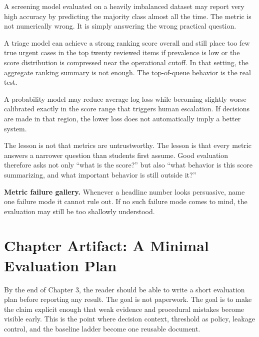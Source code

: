 \begin{example}
A screening model evaluated on a heavily imbalanced dataset may report very high accuracy by predicting the majority class almost all the time. The metric is not numerically wrong. It is simply answering the wrong practical question.
\end{example}

\begin{example}
A triage model can achieve a strong ranking score overall and still place too few true urgent cases in the top twenty reviewed items if prevalence is low or the score distribution is compressed near the operational cutoff. In that setting, the aggregate ranking summary is not enough. The top-of-queue behavior is the real test.
\end{example}

\begin{example}
A probability model may reduce average log loss while becoming slightly worse calibrated exactly in the score range that triggers human escalation. If decisions are made in that region, the lower loss does not automatically imply a better system.
\end{example}

The lesson is not that metrics are untrustworthy. The lesson is that every metric answers a narrower question than students first assume. Good evaluation therefore asks not only ``what is the score?'' but also ``what behavior is this score summarizing, and what important behavior is still outside it?''

\begin{thinkingtool}
\textbf{Metric failure gallery.} Whenever a headline number looks persuasive, name one failure mode it cannot rule out. If no such failure mode comes to mind, the evaluation may still be too shallowly understood.
\end{thinkingtool}

\section{Chapter Artifact: A Minimal Evaluation Plan}

By the end of Chapter 3, the reader should be able to write a short evaluation plan before reporting any result. The goal is not paperwork. The goal is to make the claim explicit enough that weak evidence and procedural mistakes become visible early. This is the point where decision context, threshold as policy, leakage control, and the baseline ladder become one reusable document.


